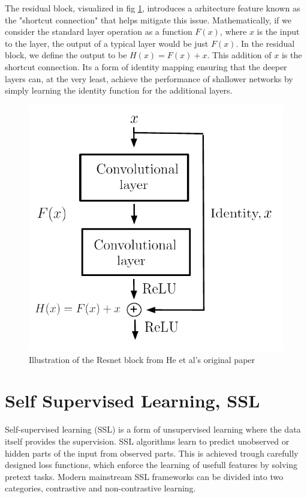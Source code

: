 The residual block, visualized in fig \ref{fig:resblock}, introduces a arhitecture feature known as the "shortcut connection" that helps mitigate this issue.
Mathematically, if we consider the standard layer operation as a function $F(x)$, where $x$ is the input to the layer, the output of a typical layer would be just $F(x)$. In the residual block,
we define the output to be $H(x) = F(x) + x$. This addition of $x$ is the shortcut connection. Its a form of identity mapping ensuring that the deeper layers can, at the very least, achieve the performance of shallower
networks by simply learning the identity function for the additional layers.

\begin{figure}[H]
    \includegraphics[scale=0.6]{figures/figure-pdf/Resnet.pdf}
    \caption{Illustration of the Resnet block from He et al's original paper\cite{ResLearn} }
    \label{fig:resblock}
\end{figure}

\section{Self Supervised Learning, SSL}
Self-supervised learning (SSL) is a form of unsupervised learning where the data itself provides the supervision. SSL algorithms learn to predict unobserved or hidden parts of the input from observed parts.
This is achieved trough carefully designed loss functions, which enforce the learning of usefull features by solving pretext tasks. Modern mainstream SSL frameworks can be divided into two categories, contrastive and non-contrastive learning.


